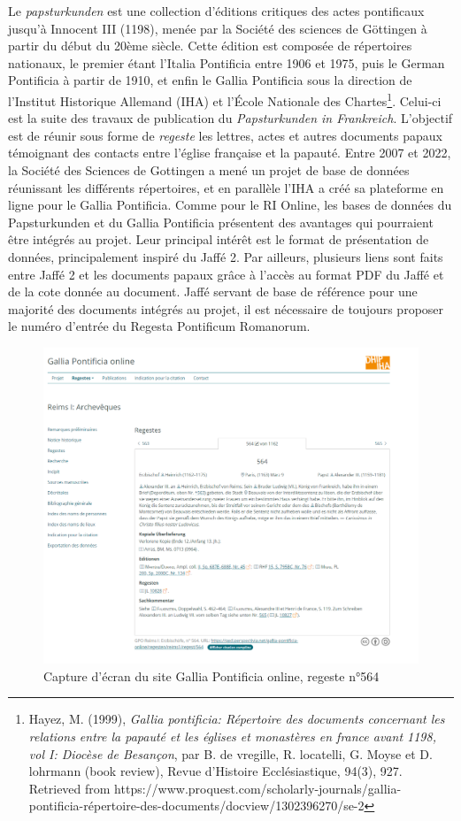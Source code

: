 Le \textit{papsturkunden} est une collection d'éditions critiques des actes pontificaux jusqu’à Innocent III (1198), menée par la Société des sciences de Göttingen à partir du début du 20ème siècle. Cette édition est composée de répertoires nationaux, le premier étant l'Italia Pontificia entre 1906 et 1975, puis le German Pontificia à partir de 1910, et enfin le Gallia Pontificia sous la direction de l'Institut Historique Allemand (IHA) et l'École Nationale des Chartes\footnote{Hayez, M. (1999), \textit{Gallia pontificia: Répertoire des documents concernant les relations entre la papauté et les églises et monastères en france avant 1198, vol I: Diocèse de Besançon}, par B. de vregille, R. locatelli, G. Moyse et D. lohrmann (book review), Revue d'Histoire Ecclésiastique, 94(3), 927. Retrieved from https://www.proquest.com/scholarly-journals/gallia-pontificia-répertoire-des-documents/docview/1302396270/se-2}. Celui-ci est la suite des travaux de publication du \textit{Papsturkunden in Frankreich}. L'objectif est de réunir sous forme de \textit{regeste} les lettres, actes et autres documents papaux témoignant des contacts entre l’église française et la papauté. 
Entre 2007 et 2022, la Société des Sciences de Gottingen a mené un projet de base de données réunissant les différents répertoires, et en parallèle l'IHA a créé sa plateforme en ligne pour le Gallia Pontificia. Comme pour le RI Online, les bases de données du Papsturkunden et du Gallia Pontificia présentent des avantages qui pourraient être intégrés au projet. Leur principal intérêt est le format de présentation de données, principalement inspiré du Jaffé 2. Par ailleurs, plusieurs liens sont faits entre Jaffé 2 et les documents papaux grâce à l’accès au format PDF du Jaffé et de la cote donnée au document. Jaffé servant de base de référence pour une majorité des documents intégrés au projet, il est nécessaire de toujours proposer le numéro d’entrée du Regesta Pontificum Romanorum. 


\begin{figure}[h]
    \centering
    \includegraphics[width=12cm]{images/Gallia_pontificia.png}
    \caption{Capture d'écran du site Gallia Pontificia online, regeste n°564}
    \label{fig:galliapontificia}
\end{figure}


